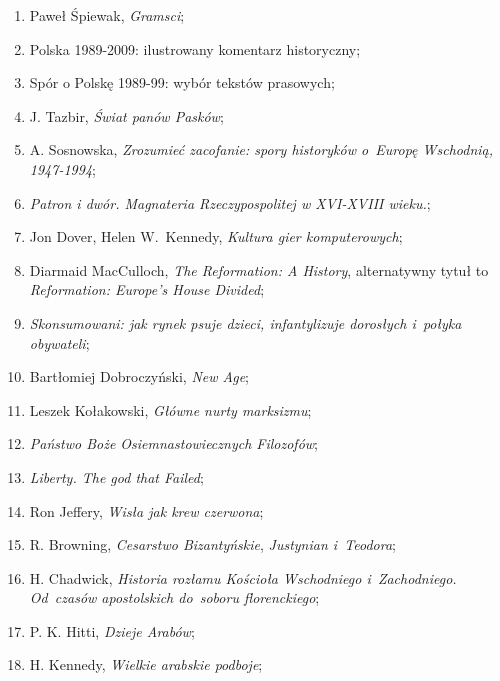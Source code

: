 \documentclass[a4paper,11pt]{article}
\begin{document}
\begin{enumerate}
\item Paweł Śpiewak, \emph{Gramsci};

\item Polska 1989-2009: ilustrowany komentarz historyczny;

\item Spór o Polskę 1989-99: wybór tekstów prasowych;

\item J. Tazbir, \emph{Świat panów Pasków};

\item A. Sosnowska, \emph{Zrozumieć zacofanie: spory historyków
    o~Europę Wschodnią, 1947-1994};

\item \emph{Patron i dwór. Magnateria Rzeczypospolitej w XVI-XVIII
    wieku.};

\item Jon Dover, Helen W.~Kennedy, \emph{Kultura gier komputerowych};

\item Diarmaid MacCulloch, \emph{The Reformation: A History},
  alternatywny tytuł to \emph{Reformation: Europe's House Divided};

\item \emph{Skonsumowani: jak rynek psuje dzieci, infantylizuje dorosłych
  i~połyka obywateli};

\item Bartłomiej Dobroczyński, \emph{New Age};

\item Leszek Kołakowski, \emph{Główne nurty marksizmu};

\item \emph{Państwo Boże Osiemnastowiecznych Filozofów};

\item \emph{Liberty. The god that Failed};

\item Ron Jeffery, \emph{Wisła jak krew czerwona};

\item R. Browning, \emph{Cesarstwo Bizantyńskie}, \emph{Justynian
    i~Teodora};

\item H. Chadwick, \emph{Historia rozłamu Kościoła Wschodniego
    i~Zachodniego. Od~czasów apostolskich do~soboru florenckiego};

\item P. K. Hitti, \emph{Dzieje Arabów};

\item H. Kennedy, \emph{Wielkie arabskie podboje};


\end{enumerate}
\end{document}

